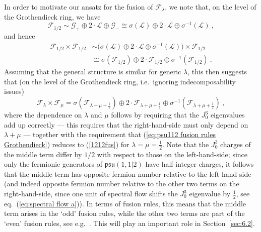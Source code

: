 \documentclass[12pt,a4paper]{article}
\newcommand{\be}{\begin{equation}}
\newcommand{\ee}{\end{equation}}
\begin{document}
In order to motivate our ansatz for the fusion of $\mathscr{F}_\lambda$, we note that, on the level of the Grothendieck ring, we have 
\be \label{F12}
\mathscr{F}_{1/2} \sim \mathscr{G}_+ \oplus 2\cdot \mathscr{L}\oplus \mathscr{G}_- \cong \sigma(\mathscr{L}) \oplus 2 \cdot \mathscr{L} \oplus \sigma^{-1}(\mathscr{L}) \ ,
\ee
and hence
\begin{align}\label{1212fus}
\mathscr{F}_{1/2} \times \mathscr{F}_{1/2} &\sim \Big(\sigma(\mathscr{L}) \oplus 2\cdot \mathscr{L}\oplus \sigma^{-1}(\mathscr{L})\Big) \times \mathscr{F}_{1/2}\\
&\cong \sigma(\mathscr{F}_{1/2}) \oplus 2\cdot \mathscr{F}_{1/2}\oplus\sigma^{-1}(\mathscr{F}_{1/2})\ .
\end{align}
Assuming that the general structure is similar for generic $\lambda$, this then suggests that 
(on the level of the Grothendieck ring, i.e.~ignoring indecomposability issues) 
\be 
\mathscr{F}_{\lambda} \times \mathscr{F}_{\mu}=\sigma(\mathscr{F}_{\lambda+\mu+\frac{1}{2}}) \oplus 2\cdot \mathscr{F}_{\lambda+\mu+\frac{1}{2}} \oplus \sigma^{-1}(\mathscr{F}_{\lambda+\mu+\frac{1}{2}})\ , \label{eq:psu112 fusion rules Grothendieck}
\ee
where the dependence on $\lambda$ and $\mu$ follows by requiring that the $J^3_0$ eigenvalues add up correctly --- this requires that the right-hand-side must only depend on $\lambda+\mu$ --- together with the requirement that (\ref{eq:psu112 fusion rules Grothendieck}) reduces to (\ref{1212fus}) for $\lambda=\mu=\frac{1}{2}$. Note that the $J^3_0$ charges of the middle term differ by $1/2$ with respect to those on the left-hand-side; since only the fermionic generators of $\mathfrak{psu}(1,1|2)$ have half-integer charges, it follows that the middle term has opposite fermion number relative to the left-hand-side (and indeed opposite fermion number relative to the other two terms on the right-hand-side, since one unit of spectral flow shifts the $J^3_0$ eigenvalue by $\frac{1}{2}$, see eq.~(\ref{eq:spectral flow a})). In terms of fusion rules, this means that the middle term arises in the `odd' fusion rules, while the other two terms are part of the `even' fusion rules, see e.g.\ \cite{Sotkov:1986bv}. This will play an important role in Section~\ref{sec:6.2}.
\end{document}
